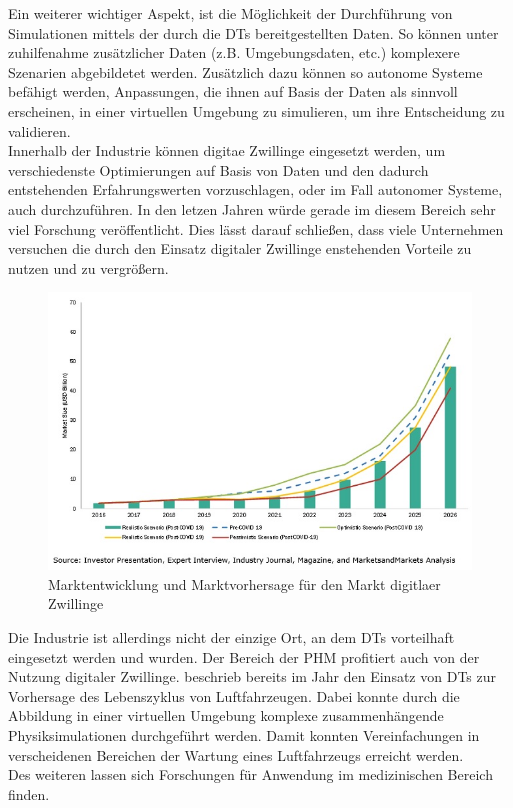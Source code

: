Ein weiterer wichtiger Aspekt, ist die Möglichkeit der Durchführung von Simulationen mittels der durch die \ac{DT}s bereitgestellten Daten. So können unter zuhilfenahme zusätzlicher Daten (z.B. Umgebungsdaten, etc.) komplexere Szenarien abgebildetet werden. Zusätzlich dazu können so autonome Systeme befähigt werden, Anpassungen, die ihnen auf Basis der Daten als sinnvoll erscheinen, in einer virtuellen Umgebung zu simulieren, um ihre Entscheidung zu validieren. \autocite{rosen2015importance}\\
Innerhalb der Industrie können digitae Zwillinge eingesetzt werden, um verschiedenste Optimierungen auf Basis von Daten und den dadurch entstehenden Erfahrungswerten vorzuschlagen, oder im Fall autonomer Systeme, auch durchzuführen. In den letzen Jahren würde gerade im diesem Bereich sehr viel Forschung veröffentlicht. \autocite[S. 167657]{barricelli2019survey} Dies lässt darauf schließen, dass viele Unternehmen versuchen die durch den Einsatz digitaler Zwillinge enstehenden Vorteile zu nutzen und zu vergrößern. 

\begin{figure}[h]
    \centering
    \includegraphics[width=1.0\linewidth]{img/digital-twin-market12.jpg}
    \caption[Übersicht Marktgröße \ac{DT}]{Marktentwicklung und Marktvorhersage für den Markt digitlaer Zwillinge \autocite{markets2020}}
\end{figure}


Die Industrie ist allerdings nicht der einzige Ort, an dem \ac{DT}s vorteilhaft eingesetzt werden und wurden. Der Bereich der \ac{PHM} profitiert auch von der Nutzung digitaler Zwillinge. \citeauthor{tuegel2011reengineering} beschrieb bereits im Jahr \citeyear{tuegel2011reengineering} den Einsatz von \ac{DT}s zur Vorhersage des Lebenszyklus von Luftfahrzeugen. Dabei konnte durch die Abbildung in einer virtuellen Umgebung komplexe zusammenhängende Physiksimulationen durchgeführt werden. Damit konnten Vereinfachungen in verscheidenen Bereichen der Wartung eines Luftfahrzeugs erreicht werden.\autocites{tao2018digital}{tuegel2011reengineering} \\
Des weiteren lassen sich Forschungen für Anwendung im medizinischen Bereich finden. \autocites{barricelli2019survey}{tao2018digital}

